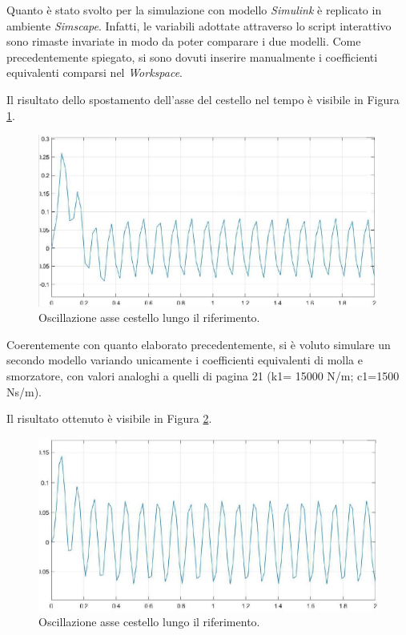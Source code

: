 Quanto è stato svolto per la simulazione con modello \textit{Simulink} è replicato in ambiente \textit{Simscape}. Infatti, le variabili adottate attraverso lo script interattivo sono rimaste invariate in modo da poter comparare i due modelli. Come precedentemente spiegato, si sono dovuti inserire manualmente i coefficienti equivalenti comparsi nel \textit{Workspace}. 

Il risultato dello spostamento dell'asse del cestello nel tempo è visibile in Figura \ref{PrimoPlotSimscape}.
\begin{figure}[h]
    \centering
    \includegraphics[scale=0.5]{Immagini/PrimoPlotSimScape.JPG}
    \caption{Oscillazione asse cestello lungo il riferimento.}
    \label{PrimoPlotSimscape}
\end{figure}

Coerentemente con quanto elaborato precedentemente, si è voluto simulare un secondo modello variando unicamente i coefficienti equivalenti di molla e smorzatore, con valori analoghi a quelli di pagina 21 (k1= 15000 N/m; c1=1500 Ns/m).

Il risultato ottenuto è visibile in Figura \ref{SecondoPlotSimscape}.\\
\begin{figure}[h]
    \centering
    \includegraphics[scale=0.5]{Immagini/SecondoPlotSimScape.JPG}
    \caption{Oscillazione asse cestello lungo il riferimento.}
    \label{SecondoPlotSimscape}
\end{figure}

